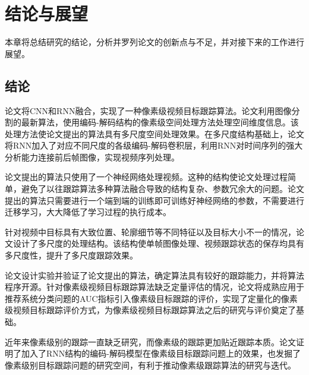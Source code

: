 
\chapter{结论与展望}
本章将总结研究的结论，分析并罗列论文的创新点与不足，并对接下来的工作进行展望。

\section{结论}
论文将CNN和RNN融合，实现了一种像素级视频目标跟踪算法。论文利用图像分割的最新算法，使用编码-解码结构的像素级空间处理方法处理空间维度信息。该处理方法使论文提出的算法具有多尺度空间处理效果。在多尺度结构基础上，论文将RNN加入了对应不同尺度的各级编码-解码卷积层，利用RNN对时间序列的强大分析能力连接前后帧图像，实现视频序列处理。
\par
论文提出的算法只使用了一个神经网络处理视频。这种的结构使论文处理过程简单，避免了以往跟踪算法多种算法融合导致的结构复杂、参数冗余大的问题。论文提出的算法只需要进行一个端到端的训练即可训练好神经网络的参数，不需要进行迁移学习，大大降低了学习过程的执行成本。
\par
针对视频中目标具有大致位置、轮廓细节等不同特征以及目标大小不一的情况，论文设计了多尺度的处理结构。该结构使单帧图像处理、视频跟踪状态的保存均具有多尺度性，提升了多尺度跟踪效果。
\par
论文设计实验并验证了论文提出的算法，确定算法具有较好的跟踪能力，并将算法程序开源。针对像素级视频目标跟踪算法缺乏定量评估的情况，论文将成熟应用于推荐系统分类问题的AUC指标引入像素级目标跟踪的评价，实现了定量化的像素级视频目标跟踪评价方式，为像素级视频目标跟踪算法之后的研究与评价奠定了基础。
\par
近年来像素级别的跟踪一直缺乏研究，而像素级的跟踪更加贴近跟踪本质。论文证明了加入了RNN结构的编码-解码模型在像素级目标跟踪问题上的效果，也发掘了像素级别目标跟踪问题的研究空间，有利于推动像素级跟踪算法的研究与迭代。

